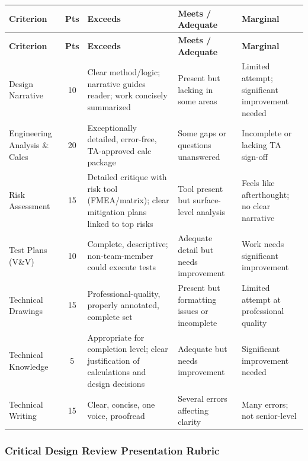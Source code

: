 {\small
\begin{longtable}{p{3.2cm} c p{3.5cm} p{3.5cm} p{2.8cm}}
\toprule
\textbf{Criterion} & \textbf{Pts} & \textbf{Exceeds} & \textbf{Meets / Adequate} & \textbf{Marginal} \\
\midrule
\endfirsthead
\toprule
\textbf{Criterion} & \textbf{Pts} & \textbf{Exceeds} & \textbf{Meets / Adequate} & \textbf{Marginal} \\
\midrule
\endhead
\bottomrule
\endfoot

Design Narrative & 10 & Clear method/logic; narrative guides reader; work concisely summarized & Present but lacking in some areas & Limited attempt; significant improvement needed \\
\addlinespace
Engineering Analysis \& Calcs & 20 & Exceptionally detailed, error-free, TA-approved calc package & Some gaps or questions unanswered & Incomplete or lacking TA sign-off \\
\addlinespace
Risk Assessment & 15 & Detailed critique with risk tool (FMEA/matrix); clear mitigation plans linked to top risks & Tool present but surface-level analysis & Feels like afterthought; no clear narrative \\
\addlinespace
Test Plans (V\&V) & 10 & Complete, descriptive; non-team-member could execute tests & Adequate detail but needs improvement & Work needs significant improvement \\
\addlinespace
Technical Drawings & 15 & Professional-quality, properly annotated, complete set & Present but formatting issues or incomplete & Limited attempt at professional quality \\
\addlinespace
Technical Knowledge & 5 & Appropriate for completion level; clear justification of calculations and design decisions & Adequate but needs improvement & Significant improvement needed \\
\addlinespace
Technical Writing & 15 & Clear, concise, one voice, proofread & Several errors affecting clarity & Many errors; not senior-level \\

\end{longtable}
}

\subsubsection{Critical Design Review Presentation Rubric}
\label{sssec:rubric-cdr-pres}


